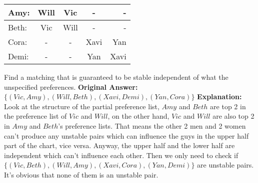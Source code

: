 \documentclass{article}       %
\begin{document}
\begin{enumerate}
\begin{tabular}{ | l | c | c | c | r | }
                \end{tabular}
                \begin{tabular}{ | l | c | c | c | r | }
                	\hline
                	Amy: & Will & Vic & - & -\\ \hline
                	Beth: & Vic & Will & - & - \\ \hline
                	Cora: & - & - & Xavi & Yan \\ \hline
                	Demi: & - & - & Yan & Xavi \\ \hline
                \end{tabular} \newline
                Find a matching that is guaranteed to be stable independent of what the unspecified preferences.\newline\newline
                \textbf{Original Answer:}\newline
                $\{(Vic, Amy), (Will, Beth), (Xavi, Demi), (Yan, Cora)\}$\newline\newline
                \textbf{Explanation:}\newline
                Look at the structure of the partial preference list, $Amy$ and $Beth$ are top 2 in the preference list of $Vic$ and $Will$, on the other hand, $Vic$ and $Will$ are also top 2 in $Amy$ and $Beth$'s preference lists. That means the other 2 men and 2 women can't produce any unstable pairs which can influence the guys in the upper half part of the chart, vice versa. Anyway, the upper half and the lower half are independent which can't influence each other. Then we only need to check if $\{(Vic, Beth), (Will, Amy), (Xavi, Cora), (Yan, Demi)\}$ are unstable pairs. It's obvious that none of them is an unstable pair.\newline
         \end{enumerate}
\end{document}
